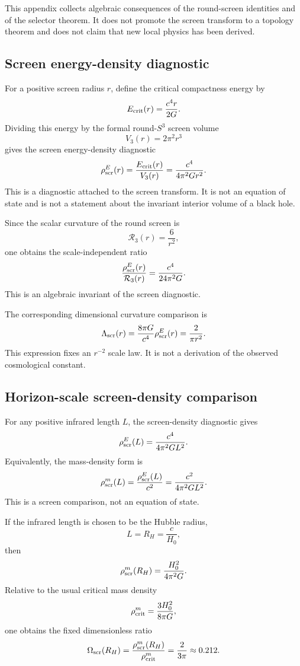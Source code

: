 \documentclass[11pt,a4paper]{article}
\begin{document}
This appendix collects algebraic consequences of the round-screen identities and of the selector theorem.  It does not promote the screen transform to a topology theorem and does not claim that new local physics has been derived.

\subsection{Screen energy-density diagnostic}

For a positive screen radius \(r\), define the critical compactness energy by
\[
E_{\rm crit}(r)=\frac{c^4r}{2G}.
\]
Dividing this energy by the formal round-\(S^3\) screen volume
\[
V_3(r)=2\pi^2r^3
\]
gives the screen energy-density diagnostic
\[
\rho_{\rm scr}^{E}(r)
=
\frac{E_{\rm crit}(r)}{V_3(r)}
=
\frac{c^4}{4\pi^2G r^2}.
\]
This is a diagnostic attached to the screen transform.  It is not an equation of state and is not a statement about the invariant interior volume of a black hole.

Since the scalar curvature of the round screen is
\[
\mathcal R_3(r)=\frac6{r^2},
\]
one obtains the scale-independent ratio
\[
\frac{\rho_{\rm scr}^{E}(r)}{\mathcal R_3(r)}
=
\frac{c^4}{24\pi^2G}.
\]
This is an algebraic invariant of the screen diagnostic.

The corresponding dimensional curvature comparison is
\[
\Lambda_{\rm scr}(r)
=
\frac{8\pi G}{c^4}\rho_{\rm scr}^{E}(r)
=
\frac{2}{\pi r^2}.
\]
This expression fixes an \(r^{-2}\) scale law.  It is not a derivation of the observed cosmological constant.

\subsection{Horizon-scale screen-density comparison}
\label{subsec:horizon-screen-density-comparison}

For any positive infrared length \(L\), the screen-density diagnostic gives
\[
\rho_{\rm scr}^{E}(L)
=
\frac{c^4}{4\pi^2G L^2}.
\]
Equivalently, the mass-density form is
\[
\rho_{\rm scr}^{m}(L)
=
\frac{\rho_{\rm scr}^{E}(L)}{c^2}
=
\frac{c^2}{4\pi^2G L^2}.
\]
This is a screen comparison, not an equation of state.

If the infrared length is chosen to be the Hubble radius,
\[
L=R_H=\frac{c}{H_0},
\]
then
\[
\rho_{\rm scr}^{m}(R_H)
=
\frac{H_0^2}{4\pi^2G}.
\]
Relative to the usual critical mass density
\[
\rho_{\rm crit}^{m}
=
\frac{3H_0^2}{8\pi G},
\]
one obtains the fixed dimensionless ratio
\[
\Omega_{\rm scr}(R_H)
=
\frac{\rho_{\rm scr}^{m}(R_H)}{\rho_{\rm crit}^{m}}
=
\frac{2}{3\pi}
\approx0.212.
\]
\end{document}
